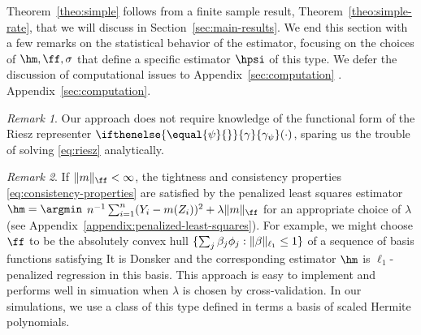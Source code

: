 \documentclass[aos,submission]{imsart}
\theoremstyle{plain}
\theoremstyle{remark}
\newtheorem{rema}{Remark}
\newcommand{\riesz}[1][]{\ifthenelse{\equal{#1}{}}{\gamma}{\gamma_{{#1}}}}
\DeclarePairedDelimiter\norm{\lVert}{\rVert}
\DeclarePairedDelimiter\set{\{}{\}}
\begin{document}
Theorem~\ref{theo:simple} follows from a finite sample result, Theorem~\ref{theo:simple-rate},
that we will discuss in Section~\ref{sec:main-results}. 
We end this section with a few remarks on the statistical behavior of the estimator, 
focusing on the choices of $\hm,\ff,\sigma$ that define a specific estimator $\hpsi$ of this type. 
We defer the discussion of computational issues to 
\ifaos
Appendix~\ref{sec:computation} \citep{amle-supplement}.
\else
Appendix~\ref{sec:computation}.
\fi


\begin{rema}
\label{rema:riesz-assumptions}
Our approach does not require knowledge of the functional form of the Riesz representer $\riesz[\psi](\cdot)$,
sparing us the trouble of solving \eqref{eq:riesz} analytically. 
\end{rema}

\begin{rema}
\label{rema:consistency}
If $\norm{m}_{\ff} < \infty$, the tightness and consistency properties \eqref{eq:consistency-properties}
are satisfied by the penalized least squares estimator $\hm=\argmin$ $n^{-1}\sum_{i=1}^n (Y_i - m(Z_i))^2 + \lambda \norm{m}_{\ff}$
for an appropriate choice of $\lambda$ (see Appendix~\ref{appendix:penalized-least-squares}).
For example, we might choose $\ff$ to be the absolutely convex hull $\set{ \sum_j  \beta_j \phi_j : \norm{\beta}_{\ell_1} \le 1}$
of a sequence of basis functions satisfying 
It is Donsker \citep[Section 2.13.2]{vandervaart-wellner1996:weak-convergence}
and the corresponding estimator $\hm$ is $\ell_1$-penalized regression in this basis.
This approach is easy to implement and performs well in simuation when $\lambda$ is chosen by cross-validation.
In our simulations, we use a class of this type defined in terms a basis of scaled Hermite polynomials.
\end{rema}
\end{document}
